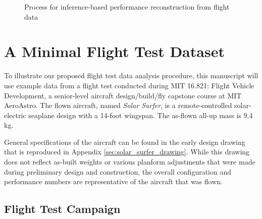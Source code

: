 \documentclass[conf]{new-aiaa}
\begin{document}
    \begin{figure}[H]
        \centering
        \caption{Process for inference-based performance reconstruction from flight data}
        \label{fig:overall_procedure}
    \end{figure}


    \section{A Minimal Flight Test Dataset}

    To illustrate our proposed flight test data analysis procedure, this manuscript will use example data from a flight test conducted during MIT 16.821: Flight Vehicle Development, a senior-level aircraft design/build/fly capstone course at MIT AeroAstro. The flown aircraft, named \emph{Solar Surfer}, is a remote-controlled solar-electric seaplane design with a 14-foot wingspan. The as-flown all-up mass is 9.4 kg.

    General specifications of the aircraft can be found in the early design drawing that is reproduced in Appendix \ref{sec:solar_surfer_drawing}. While this drawing does not reflect as-built weights or various planform adjustments that were made during preliminary design and construction, the overall configuration and performance numbers are representative of the aircraft that was flown.

    \subsection{Flight Test Campaign}
\end{document}
